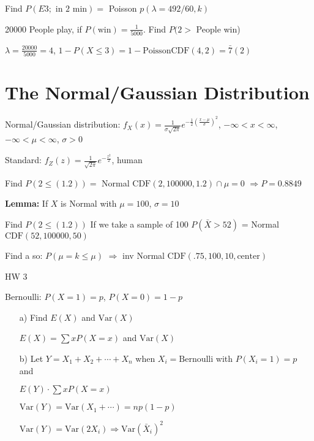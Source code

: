 Find $P(E3; \text{ in } 2 \text{ min}) = $ Poisson $p(\lambda = 492/60, k)$

\begin{example}
20000 People play, if $P(\text{win}) = \frac{1}{5000}$. Find $P(2>$ People win)

$\lambda = \frac{20000}{5000} = 4$, $1 - P(X \leq 3) = 1 - \text{Poisson} \text{CDF}(4, 2) = \bar{7}(2)$
\end{example}

\section{The Normal/Gaussian Distribution}

\begin{definition}
Normal/Gaussian distribution: $f_X(x) = \frac{1}{\sigma\sqrt{2\pi}} e^{-\frac{1}{2}\left(\frac{x-\mu}{\sigma}\right)^2}$, $-\infty < x < \infty$, $-\infty < \mu < \infty$, $\sigma > 0$

Standard: $f_Z(z) = \frac{1}{\sqrt{2\pi}} e^{-\frac{z^2}{2}}$, human
\end{definition}

\begin{example}
Find $P(2 \leq (1.2)) = $ Normal $\text{CDF}(2, 100000, 1.2) \cap \mu = 0$ $\Rightarrow P = 0.8849$

\textbf{Lemma:} If $X$ is Normal with $\mu = 100$, $\sigma = 10$

Find $P(2 \leq (1.2))$ If we take a sample of 100 $P(\bar{X} > 52)$ = Normal $\text{CDF}(52, 100000, 50)$

Find a so: $P(\mu = k \leq \mu)$ $\Rightarrow$ inv Normal $\text{CDF}(.75, 100, 10, \text{center})$
\end{example}

HW 3

Bernoulli: $P(X = 1) = p$, $P(X = 0) = 1 - p$

\begin{enumerate}
\item[a)] Find $E(X)$ and $\text{Var}(X)$

$E(X) = \sum x P(X = x)$ and $\text{Var}(X)$

b) Let $Y = X_1 + X_2 + \cdots + X_n$ when $X_i = \text{Bernoulli}$ with $P(X_i = 1) = p$ and

$E(Y) \cdot \sum x P(X = x)$

$\text{Var}(Y) = \text{Var}(X_1 + \cdots) = np(1 - p)$

$\text{Var}(Y) = \text{Var}(2X_i) \Rightarrow \text{Var}(\bar{X}_i)^2$
\end{enumerate}

